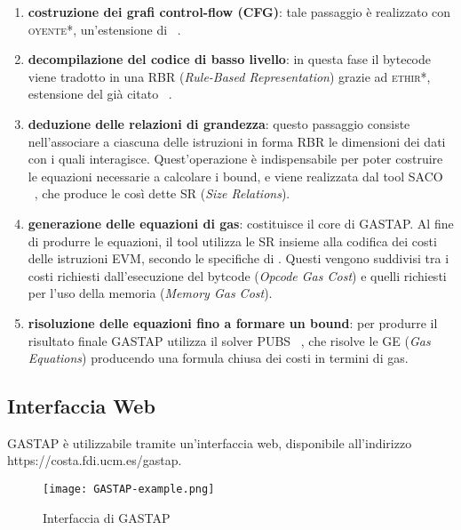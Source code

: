     \begin{enumerate}
        \item \textbf{costruzione dei grafi control-flow (CFG)}: tale passaggio è realizzato con \textsc{oyente*}, un'estensione di ~\cite{melonproject/oyente}.
        \item \textbf{decompilazione del codice di basso livello}: in questa fase il bytecode viene tradotto in una RBR (\textit{Rule-Based Representation}) grazie ad \textsc{ethir*}, estensione del già citato ~\cite{albert2018ethir}.
        \item \textbf{deduzione delle relazioni di grandezza}: questo passaggio consiste nell'associare a ciascuna delle istruzioni in forma RBR le dimensioni dei dati con i quali interagisce. Quest'operazione è indispensabile per poter costruire le equazioni necessarie a calcolare i bound, e viene realizzata dal tool SACO ~\cite{10.1007/978-3-642-54862-8_46}, che produce le così dette SR (\textit{Size Relations}).
        \item \textbf{generazione delle equazioni di gas}: costituisce il core di GASTAP. Al fine di produrre le equazioni, il tool utilizza le SR insieme alla codifica dei costi delle istruzioni EVM, secondo le specifiche di \cite{wood2014ethereum}. Questi vengono suddivisi tra i costi richiesti dall'esecuzione del bytcode (\textit{Opcode Gas Cost}) e quelli richiesti per l'uso della memoria (\textit{Memory Gas Cost}). 
        \item \textbf{risoluzione delle equazioni fino a formare un bound}: per produrre il risultato finale GASTAP utilizza il solver PUBS ~\cite{albert2008automatic}, che risolve le GE (\textit{Gas Equations}) producendo una formula chiusa dei costi in termini di gas. 
    \end{enumerate}

    \subsection{Interfaccia Web}
    
    GASTAP è utilizzabile tramite un'interfaccia web, disponibile all'indirizzo \\
    https://costa.fdi.ucm.es/gastap.
    
    \begin{figure}[h]
        \centering
        \texttt{[image: GASTAP-example.png]}
        \caption{Interfaccia di GASTAP}
        \label{fig:gstp-example}
    \end{figure}
    
